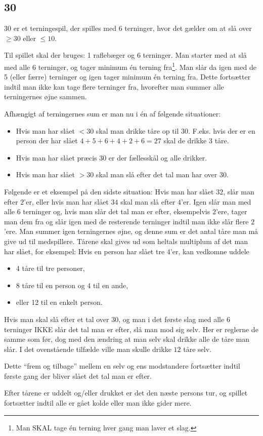 \subsection{30}
30 er et terningespil, der spilles med 6 terninger, hvor det gælder om at slå over $\geq 30$ eller $\leq 10$.

Til spillet skal der bruges: 1 raflebæger og 6 terninger. Man starter med at slå med alle 6 terninger, og tager minimum én terning fra\footnote{Man SKAL tage én terning hver gang man laver et slag.}. Man slår da igen med de 5 (eller færre) terninger og igen tager minimum én terning fra. Dette fortsætter indtil man ikke kan tage flere terninger fra, hvorefter man summer alle terningernes øjne sammen.

Afhængigt af terningernes sum er man nu i én af følgende situationer:
\begin{itemize}
    \item Hvis man har slået $<30$ skal man drikke tåre op til $30$. F.eks. hvis der er en person der har slået $4 + 5 + 6 + 4 + 2 + 6 = 27$ skal de drikke 3 tåre.
    \item Hvis man har slået præcis $30$ er der fællesskål og alle drikker.
    \item Hvis man har slået $>30$ skal man slå efter det tal man har over $30$.
\end{itemize}

Følgende er et eksempel på den sidste situation: Hvis man har slået $32$, slår man efter $2$'er, eller hvis man har slået $34$ skal man slå efter $4$'er. Igen slår man med alle $6$ terninger og, hvis man slår det tal man er efter, eksempelvis $2$'ere, tager man dem fra og slår igen med de resterende terninger indtil man ikke slår flere $2$'ere. Man summer igen terningernes øjne, og denne sum er det antal tåre man må give ud til medspillere. Tårene skal gives ud som heltals multiplum af det man har slået, for eksempel: Hvis en person har slået tre $4$'er, kan vedkomne uddele
\begin{itemize}
    \item 4 tåre til tre personer,
    \item 8 tåre til en person og 4 til en ande,
    \item eller 12 til en enkelt person.
\end{itemize}

Hvis man skal slå efter et tal over $30$, og man i det første slag med alle $6$ terninger IKKE slår det tal man er efter, slå man mod sig selv. Her er reglerne de samme som før, dog med den ændring at man selv skal drikke alle de tåre man slår. I det ovenstående tilfælde ville man skulle drikke $12$ tåre selv.

Dette ``frem og tilbage'' mellem en selv og ens modstandere fortsætter indtil første gang der bliver slået det tal man er efter.

Efter tårene er uddelt og/eller drukket er det den næste persons tur, og spillet fortsætter indtil alle er gået kolde eller man ikke gider mere.